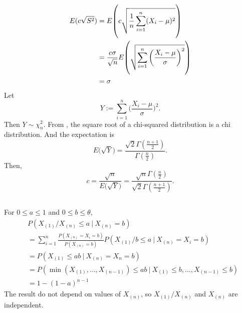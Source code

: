 \begin{align}
    E(c\sqrt{S^2})
        &= E\vast(c\sqrt{\frac{1}{n}\sum_{i=1}^n(X_i-\mu)^2}\vast) \\
        &= \frac{c\sigma}{\sqrt{n}}E\vast(\sqrt{\sum_{i=1}^n\bigg(\frac{X_i-\mu}{\sigma}\bigg)^2}\vast) \\
        &= \sigma
\end{align}
Let
\begin{equation}
    Y:=\sum_{i=1}^n\bigg(\frac{X_i-\mu}{\sigma}\bigg)^2.
\end{equation}
Then $Y\sim\chi^2_n$.
From \cite{chi}, the square root of a chi-squared distribution is a chi distribution.
And the expectation is
\begin{equation}
    E\big(\sqrt{Y}\big) = \frac{\sqrt{2}\Gamma(\frac{n+1}{2})}{\Gamma(\frac{n}{2})}.
\end{equation}
Then,
\begin{equation}
    c = \frac{\sqrt{n}}{E\big(\sqrt{Y}\big)}
      = \frac{\sqrt{n}\Gamma(\frac{n}{2})}{\sqrt{2}\Gamma(\frac{n+1}{2})}.
\end{equation}


\subsection{} %

For $0\le a\le 1$ and $0\le b\le\theta$,
\begin{align}
    & P(X_{(1)}/X_{(n)}\le a ~|~ X_{(n)}=b) \\
        &= \sum_{i=1}^n \frac{P(X_{(n)}=X_i=b)}{P(X_{(n)}=b)} P(X_{(1)}/b\le a ~|~ X_{(n)}=X_i=b) \\
        &= P(X_{(1)}\le ab ~|~ X_{(n)}=X_n=b) \\
        &= P(\min(X_{(1)},\dots,X_{(n-1)})\le ab ~|~ X_{(1)}\le b,\dots,X_{(n-1)}\le b) \\
        &= 1 - (1 - a)^{n-1}
\end{align}
The result do not depend on values of $X_{(n)}$,
so $X_{(1)}/X_{(n)}$ and $X_{(n)}$ are independent.

\subsection{} %

\todo

